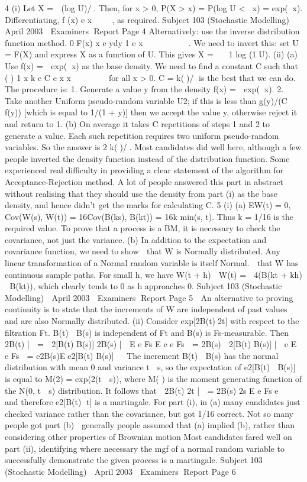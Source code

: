 4 (i) Let X =  (log U)/. Then, for x > 0,
P(X > x) = P(log U < x) = exp(x).
Differentiating, f (x) e x 
  , as required.
Subject 103 (Stochastic Modelling)  April 2003  Examiners Report
Page 4
Alternatively: use the inverse distribution function method.
0
F(x) x e ydy 1 e x    
    . We need to invert this: set U = F(X) and express
X as a function of U. This gives X =   1 log (1U).
(ii) (a) Use f(x) =  exp(x) as the base density. We need to find a constant
C such that ( )
1
x
k e C e x
x


  

for all x > 0.
C = k()/ is the best that we can do.
The procedure is:
1. Generate a value y from the density f(x) =  exp(x).
2. Take another Uniform pseudo-random variable U2; if this is less
than g(y)/(C f(y)) [which is equal to 1/(1 + y)] then we accept the
value y, otherwise reject it and return to 1.
(b) On average it takes C repetitions of steps 1 and 2 to generate a value.
Each such repetition requires two uniform pseudo-random variables.
So the answer is 2 k()/.
Most candidates did well here, although a few people inverted the density function
instead of the distribution function.
Some experienced real difficulty in providing a clear statement of the algorithm for
Acceptance-Rejection method. A lot of people answered this part in abstract without
realising that they should use the density from part (i) as the base density, and hence
didn’t get the marks for calculating C.
5 (i) (a) EW(t) = 0, Cov(W(s), W(t)) = 16Cov(B(ks), B(kt)) = 16k min(s, t).
Thus k = 1/16 is the required value.
To prove that a process is a BM, it is necessary to check the
covariance, not just the variance.
(b) In addition to the expectation and covariance function, we need to
show
  that W is Normally distributed. Any linear transformation of a
Normal random variable is itself Normal.
  that W has continuous sample paths. For small h, we have
W(t + h)  W(t) =  4(B(kt + kh)  B(kt)), which clearly tends to 0
as h approaches 0.
Subject 103 (Stochastic Modelling)  April 2003  Examiners Report
Page 5
  An alternative to proving continuity is to state that the increments
of W are independent of past values and are also Normally
distributed.
(ii) Consider exp[2B(t)2t] with respect to the filtration Ft.
B(t)  B(s) is independent of Ft and B(s) is Fs-measurable. Then
 2B(t) |  =  2[B(t) B(s)] 2B(s) | 
E e Fs E e e Fs 
= 2B(s)  2[B(t) B(s)] | 
e E e Fs 
= e2B(s)Ee2[B(t) B(s)]  
The increment B(t)  B(s) has the normal distribution with mean 0 and
variance t 	s, so the expectation of e2[B(t)  B(s)] is equal to
M(2) = exp(2(t  s)), where M(
) is the moment generating function of the
N(0, t  s) distribution.
It follows that
 2B(t) 2t |  = 2B(s) 2s
E e Fs e  
and therefore e2[B(t) t] is a martingale.
For part (i), in (a) many candidates just checked variance rather than the covariance,
but got 1/16 correct. Not so many people got part (b)  generally people assumed
that (a) implied (b), rather than considering other properties of Brownian motion
Most candidates fared well on part (ii), identifying where necessary the mgf of a
normal random variable to successfully demonstrate the given process is a
martingale.
Subject 103 (Stochastic Modelling)  April 2003  Examiners Report
Page 6
